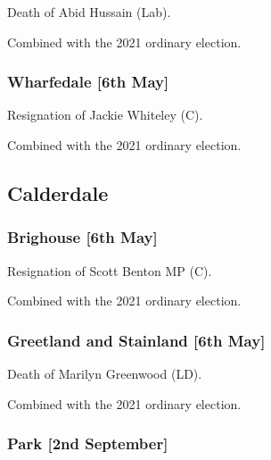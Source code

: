 \documentclass[a4paper,openany]{book}
\begin{document}
\begin{resultsiii}

Death of Abid Hussain (Lab).

Combined with the 2021 ordinary election.

\subsubsection*{Wharfedale \hspace*{\fill}\nolinebreak[1]%
	\enspace\hspace*{\fill}
	[6th May]}


Resignation of Jackie Whiteley (C).

Combined with the 2021 ordinary election.

\subsection*{Calderdale}

\subsubsection*{Brighouse \hspace*{\fill}\nolinebreak[1]%
	\enspace\hspace*{\fill}
	[6th May]}


Resignation of Scott Benton MP (C).

Combined with the 2021 ordinary election.

\subsubsection*{Greetland and Stainland \hspace*{\fill}\nolinebreak[1]%
	\enspace\hspace*{\fill}
	[6th May]}


Death of Marilyn Greenwood (LD).

Combined with the 2021 ordinary election.

\subsubsection*{Park \hspace*{\fill}\nolinebreak[1]%
	\enspace\hspace*{\fill}
	[2nd September]}


\end{resultsiii}
\end{document}
